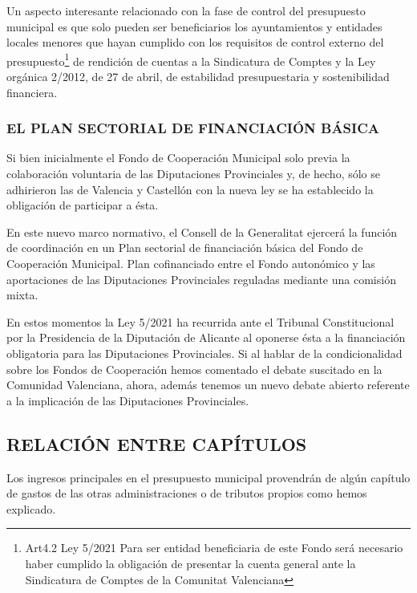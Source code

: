 \documentclass[
]{article}
\begin{document}
Un aspecto interesante relacionado con la fase de control del
presupuesto municipal es que solo pueden ser beneficiarios los
ayuntamientos y entidades locales menores que hayan cumplido con los
requisitos de control externo del presupuesto\footnote{Art4.2 Ley 5/2021
  Para ser entidad beneficiaria de este Fondo será necesario haber
  cumplido la obligación de presentar la cuenta general ante la
  Sindicatura de Comptes de la Comunitat Valenciana} de rendición de
cuentas a la Sindicatura de Comptes y la Ley orgánica 2/2012, de 27 de
abril, de estabilidad presupuestaria y sostenibilidad financiera.

\hypertarget{el-plan-sectorial-de-financiaciuxf3n-buxe1sica}{%
\subsubsection{EL PLAN SECTORIAL DE FINANCIACIÓN
BÁSICA}\label{el-plan-sectorial-de-financiaciuxf3n-buxe1sica}}

Si bien inicialmente el Fondo de Cooperación Municipal solo previa la
colaboración voluntaria de las Diputaciones Provinciales y, de hecho,
sólo se adhirieron las de Valencia y Castellón con la nueva ley se ha
establecido la obligación de participar a ésta.

En este nuevo marco normativo, el Consell de la Generalitat ejercerá la
función de coordinación en un Plan sectorial de financiación básica del
Fondo de Cooperación Municipal. Plan cofinanciado entre el Fondo
autonómico y las aportaciones de las Diputaciones Provinciales reguladas
mediante una comisión mixta.

En estos momentos la Ley 5/2021 ha recurrida ante el Tribunal
Constitucional por la Presidencia de la Diputación de Alicante al
oponerse ésta a la financiación obligatoria para las Diputaciones
Provinciales. Si al hablar de la condicionalidad sobre los Fondos de
Cooperación hemos comentado el debate suscitado en la Comunidad
Valenciana, ahora, además tenemos un nuevo debate abierto referente a la
implicación de las Diputaciones Provinciales.

\hypertarget{relaciuxf3n-entre-capuxedtulos}{%
\subsection{RELACIÓN ENTRE
CAPÍTULOS}\label{relaciuxf3n-entre-capuxedtulos}}

Los ingresos principales en el presupuesto municipal provendrán de algún
capítulo de gastos de las otras administraciones o de tributos propios
como hemos explicado.
\end{document}
